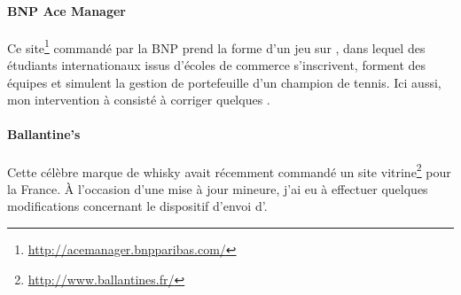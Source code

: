 \paragraph{BNP Ace Manager} Ce site\footnote{\url{http://acemanager.bnpparibas.com/}} commandé par la BNP prend la forme d'un jeu sur \ainternet, dans lequel des étudiants internationaux issus d'écoles de commerce s'inscrivent, forment des équipes et simulent la gestion de portefeuille d'un champion de tennis. Ici aussi, mon intervention à consisté à corriger quelques \abugs.

\paragraph{Ballantine's} Cette célèbre marque de whisky avait récemment commandé un site vitrine\footnote{\url{http://www.ballantines.fr/}} pour la France. À l'occasion d'une mise à jour mineure, j'ai eu à effectuer quelques modifications concernant le dispositif d'envoi d'\aemails.
